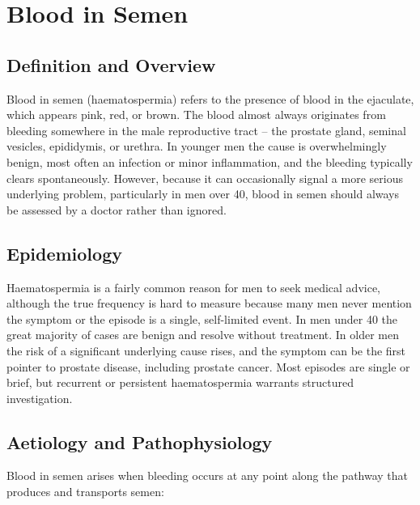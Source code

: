 \chapter{Blood in Semen}

\section*{Definition and Overview}
Blood in semen (haematospermia) refers to the presence of blood in the ejaculate, which appears pink, red, or brown. The blood almost always originates from bleeding somewhere in the male reproductive tract -- the prostate gland, seminal vesicles, epididymis, or urethra. In younger men the cause is overwhelmingly benign, most often an infection or minor inflammation, and the bleeding typically clears spontaneously. However, because it can occasionally signal a more serious underlying problem, particularly in men over 40, blood in semen should always be assessed by a doctor rather than ignored.

\section*{Epidemiology}
Haematospermia is a fairly common reason for men to seek medical advice, although the true frequency is hard to measure because many men never mention the symptom or the episode is a single, self-limited event. In men under 40 the great majority of cases are benign and resolve without treatment. In older men the risk of a significant underlying cause rises, and the symptom can be the first pointer to prostate disease, including prostate cancer. Most episodes are single or brief, but recurrent or persistent haematospermia warrants structured investigation.

\section*{Aetiology and Pathophysiology}
Blood in semen arises when bleeding occurs at any point along the pathway that produces and transports semen:

